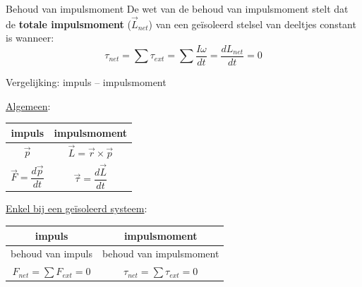 \begin{lem}{Behoud van impulsmoment}
    De wet van de behoud van impulsmoment stelt dat de \textbf{totale impulsmoment} ($ \Vec{L}_{net} $) van een geïsoleerd stelsel van deeltjes constant is wanneer: 
    \begin{equation*}
         \tau_{net} = \sum \tau_{ext} = \sum \dfrac{I\omega}{dt} = \dfrac{dL_{net}}{dt} = 0
    \end{equation*} 
    \vspace{-0.5cm}
\end{lem}

\begin{vrg}{Vergelijking: impuls – impulsmoment}
    \begin{minipage}{.48\textwidth}
        \begin{center}
            
            \underline{Algemeen}: \\
            \vspace{0.25cm}
            \def\arraystretch{2.5}
            \begin{tabular}{c|c}
                impuls & impulsmoment \\ \hline
                $ \Vec{p} $ & $ \Vec{L} = \Vec{r} \times \Vec{p} $ \\ 
                $ \Vec{F} = \dfrac{d\Vec{p}}{dt} $ &  $ \Vec{\tau} = \dfrac{d\Vec{L}}{dt} $
            \end{tabular}
    
        \end{center}
    \end{minipage} 
    \begin{minipage}{.48\textwidth}
        \begin{center}
                
            \underline{Enkel bij een geïsoleerd systeem}: \\
            \vspace{0.25cm}
            \def\arraystretch{2.5}
            \begin{tabular}{c|c}
                impuls & impulsmoment \\ \hline
                behoud van impuls & behoud van impulsmoment \\ 
                $ F_{net} = \sum F_{ext} = 0 $ & $ \tau_{net} = \sum \tau_{ext} = 0 $
            \end{tabular}
        
        \end{center}
    \end{minipage}
\end{vrg}

